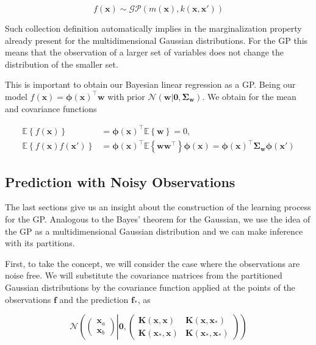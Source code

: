 \documentclass[11pt]{article} %
\begin{document}
\begin{equation}
   f(\mathbf{x}) \sim \mathcal{GP} \left( m(\mathbf{x}), k(\mathbf{x},\mathbf{x'}) \right)
\end{equation}

Such collection definition automatically implies in the marginalization property already present for the multidimensional Gaussian distributions. For the GP this means that the observation of a larger set of variables does not change the distribution of the smaller set.

This is important to obtain our Bayesian linear regression as a GP. Being our model $f(\mathbf{x})=\boldsymbol{\phi}(\mathbf{x})^\top \mathbf{w}$ with prior $\mathcal{N}\left( \mathbf{w} | \mathbf{0}, \boldsymbol{\Sigma}_{\mathbf{w}}\right)$. We obtain for the mean and covariance functions

\begin{equation}
   \label{eq:gau-pro-mean-cov}
   \begin{aligned}
      \mathbb{E}\left\{ f(\mathbf{x}) \right\} &= \boldsymbol{\phi}(\mathbf{x})^\top \mathbb{E} \left\{ \mathbf{w} \right\} = 0,\\
      \mathbb{E}\left\{ f(\mathbf{x})f(\mathbf{x'}) \right\} &= \boldsymbol{\phi}(\mathbf{x})^\top \mathbb{E} \left\{ \mathbf{ww}^\top \right\}\boldsymbol{\phi}(\mathbf{x}) = \boldsymbol{\phi}(\mathbf{x})^\top \boldsymbol{\Sigma}_{\mathbf{w}} \boldsymbol{\phi}(\mathbf{x'})
   \end{aligned}
\end{equation}

\subsection{Prediction with Noisy Observations}

The last sections give us an insight about the construction of the learning process for the GP. Analogous to the Bayes' theorem for the Gaussian, we use the idea of the GP as a multidimensional Gaussian distribution and we can make inference with its partitions. 

First, to take the concept, we will consider the case where the observations are noise free. We will substitute the covariance matrices from the partitioned Gaussian distributions by the covariance function applied at the points of the observations $\mathbf{f}$ and the prediction $\mathbf{f_*}$, as

\begin{equation}
   \mathcal{N} \left( \left( \begin{array}{c}{\mathbf{x}_{a}} \\ {\mathbf{x}_{b}}\end{array} \right) \left| \mathbf{0}, \left( \begin{array}{ll}{\mathbf{K}(\mathbf{x},\mathbf{x})} & {\mathbf{K}(\mathbf{x},\mathbf{x_*})} \\ {\mathbf{K}(\mathbf{x_*},\mathbf{x})} & {\mathbf{K}(\mathbf{x_*},\mathbf{x_*})}\end{array} \right) \right. \right)
\end{equation}
\end{document}
